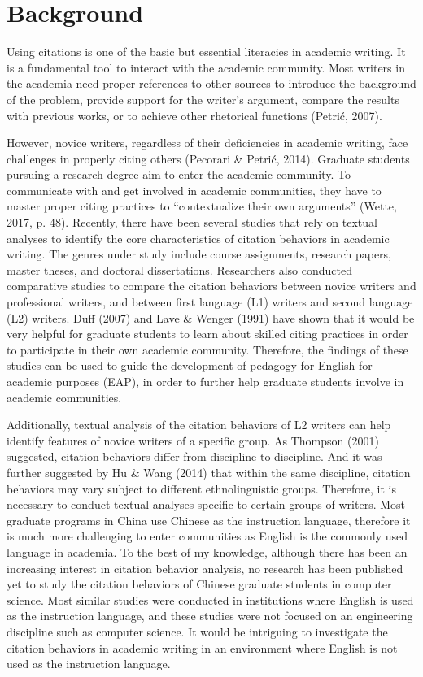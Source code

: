 \label{chap:intro}

\section{Background}
Using citations is one of the basic but essential literacies in academic writing. It is a fundamental tool to interact with the academic community. Most writers in the academia need proper references to other sources to introduce the background of the problem, provide support for the writer’s argument, compare the results with previous works, or to achieve other rhetorical functions (Petrić, 2007).

However, novice writers, regardless of their deficiencies in academic writing, face challenges in properly citing others (Pecorari \& Petrić, 2014). Graduate students pursuing a research degree aim to enter the academic community. To communicate with and get involved in academic communities, they have to master proper citing practices to “contextualize their own arguments” (Wette, 2017, p. 48). Recently, there have been several studies that rely on textual analyses to identify the core characteristics of citation behaviors in academic writing. The genres under study include course assignments, research papers, master theses, and doctoral dissertations. Researchers also conducted comparative studies to compare the citation behaviors between novice writers and professional writers, and between first language (L1) writers and second language (L2) writers. Duff (2007) and Lave \& Wenger (1991) have shown that it would be very helpful for graduate students to learn about skilled citing practices in order to participate in their own academic community. Therefore, the findings of these studies can be used to guide the development of pedagogy for English for academic purposes (EAP), in order to further help graduate students involve in academic communities.

Additionally, textual analysis of the citation behaviors of L2 writers can help identify features of novice writers of a specific group. As Thompson (2001) suggested, citation behaviors differ from discipline to discipline. And it was further suggested by Hu \& Wang (2014) that within the same discipline, citation behaviors may vary subject to different ethnolinguistic groups. Therefore, it is necessary to conduct textual analyses specific to certain groups of writers. Most graduate programs in China use Chinese as the instruction language, therefore it is much more challenging to enter communities as English is the commonly used language in academia. To the best of my knowledge, although there has been an increasing interest in citation behavior analysis, no research has been published yet to study the citation behaviors of Chinese graduate students in computer science. Most similar studies were conducted in institutions where English is used as the instruction language, and these studies were not focused on an engineering discipline such as computer science. It would be intriguing to investigate the citation behaviors in academic writing in an environment where English is not used as the instruction language.

